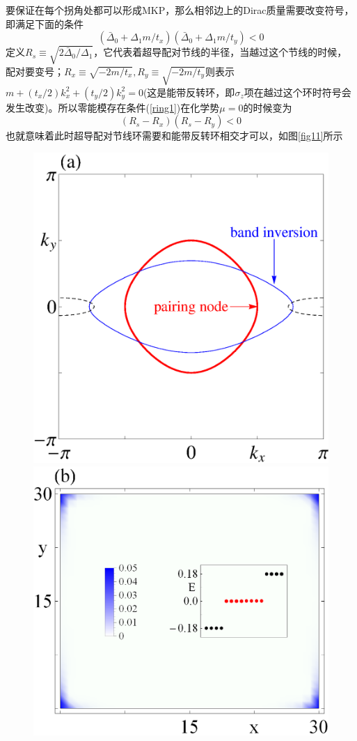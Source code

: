  要保证在每个拐角处都可以形成MKP，那么相邻边上的Dirac质量需要改变符号，即满足下面的条件
\begin{equation}
(\bar{\Delta}_0+\Delta_1m/t_x)(\bar{\Delta}_0+\Delta_1m/t_y)<0\label{ring1}
\end{equation}
定义$R_s\equiv\sqrt{2\bar{\Delta}_0/\Delta_1}$，它代表着超导配对节线的半径，当越过这个节线的时候，配对要变号；$R_x\equiv\sqrt{-2m/t_x},R_y\equiv\sqrt{-2m/t_y}$则表示$m+(t_x/2)k_x^2+(t_y/2)k_y^2=0$(这是能带反转环，即$\sigma_z$项在越过这个环时符号会发生改变)。所以零能模存在条件(\ref{ring1})在化学势$\mu=0$的时候变为
\begin{equation}
(R_s-R_x)(R_s-R_y)<0
\end{equation}
也就意味着此时超导配对节线环需要和能带反转环相交才可以，如图\ref{fig11}所示
\begin{figure}
\centering
\includegraphics[scale=0.45]{pic/fig12a}
\includegraphics[scale=0.45]{pic/fig12b}

\end{figure}
